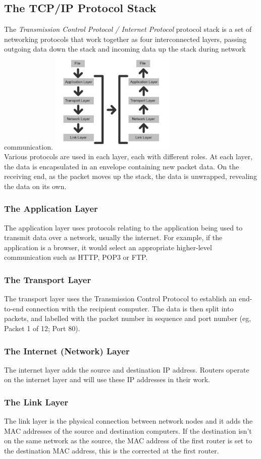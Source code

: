 \documentclass[a4paper,11pt, twocolumn]{article}
\begin{document}
\subsection{The TCP/IP Protocol Stack}
The \textit{Transmission Control Protocol / Internet Protocol} protocol stack is a set of networking protocols that work together as four interconnected layers, passing outgoing data down the stack and incoming data up the stack during network communication.
\includegraphics[width=0.45\textwidth]{tcpIP.jpg}\\
Various protocols are used in each layer, each with different roles. At each layer, the data is encapsulated in an envelope containing new packet data. On the receiving end, as the packet moves up the stack, the data is unwrapped, revealing the data on its own. 
\subsubsection{The Application Layer}
The application layer uses protocols relating to the application being used to transmit data over a network, usually the internet. For example, if the application is a browser, it would select an appropriate higher-level communication such as HTTP, POP3 or FTP.
\subsubsection{The Transport Layer}
The transport layer uses the Transmission Control Protocol to establish an end-to-end connection with the recipient computer. The data is then split into packets, and labelled with the packet number in sequence and port number (eg, Packet 1 of 12; Port 80).
\subsubsection{The Internet (Network) Layer}
The internet layer adds the source and destination IP address. Routers operate on the internet layer and will use these IP addresses in their work.
\subsubsection{The Link Layer}
The link layer is the physical connection between network nodes and it adds the MAC addresses of the source and destination computers. If the destination isn't on the same network as the source, the MAC address of the first router is set to the destination MAC address, this is the corrected at the first router.
\end{document}
